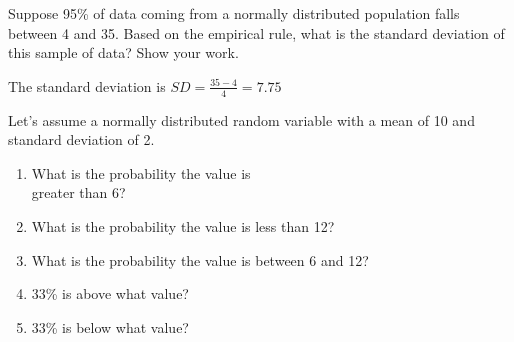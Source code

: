 \documentclass[11pt, chapterprefix=true]{scrbook}\usepackage[]{graphicx}\usepackage[]{color}
\begin{document}
\begin{exercises}
\begin{exercise}
	\end{exercise}
%
%
%

  \begin{exercise} %

Suppose 95\% of data coming from a normally distributed population falls between 4 and 35.  Based on the empirical rule, what is the standard deviation of this sample of data?  Show your work.

  \end{exercise}
  \begin{solution}   %



    The standard deviation is $SD = \frac{35 - 4}{4} = 7.75$
  \end{solution}

	\begin{exercise}  %

Let's assume a normally distributed random variable with a mean of 10 and standard deviation of 2.

\begin{enumerate}
\item What is the probability the value is \\ greater than 6?
\item What is the probability the value is less than 12?
\item What is the probability the value is between 6 and 12?
\item 33\% is above what value?
\item 33\% is below what value?
\end{enumerate}


\end{exercise}
\end{exercises}
\end{document}
